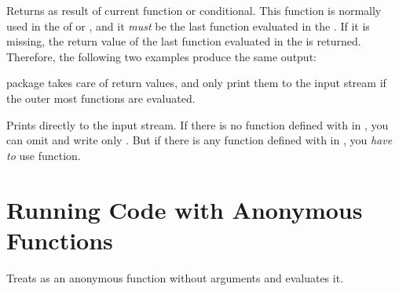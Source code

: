 \documentclass[oneside]{book}
\begin{document}
\begin{function}{\Return}
\begin{syntax}
 
\end{syntax}
Returns  as result of current function or conditional.
This function is normally used in the  of 
or , and it \emph{must} be the last function evaluated in the .
If it is missing, the return value of the last function evaluated in the 
is returned. Therefore, the following two examples produce the same output:
\begin{codehigh}
\IgnoreSpacesOn
\PrgNewFunction {} {
  \IntSet {}
  \Return {\Value \lTmpaInt}
}
\IgnoreSpacesOff
{}
\end{codehigh}
\begin{codehigh}
\IgnoreSpacesOn
\PrgNewFunction {} {
  \IntSet {}
  \Value \lTmpaInt
}
\IgnoreSpacesOff
{}
\end{codehigh}
 package takes care of return values,
and only print them to the input stream if the outer most functions are evaluated.
\end{function}

\begin{function}{\Print}
\begin{syntax}
 
\end{syntax}
Prints  directly to the input stream.
If there is no function defined with  in ,
you can omit  and write only .
But if there is any function defined with  in ,
you \emph{have to} use  function.
\end{function}

\section{Running Code with Anonymous Functions}

\begin{function}{\Do}
\begin{syntax}
 
\end{syntax}
Treats  as an anonymous function without arguments and evaluates it.
\end{function}
\end{document}
